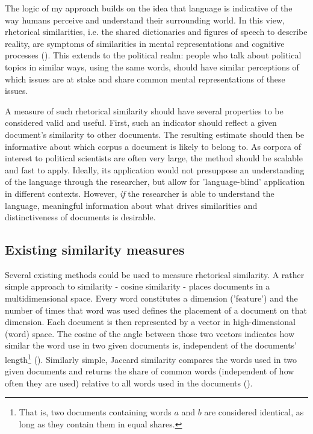 \documentclass{article}
\begin{document}
The logic of my approach builds on the idea that language is indicative of the way humans perceive and understand their surrounding world. In this view, rhetorical similarities, i.e. the shared dictionaries and figures of speech to describe reality, are symptoms of similarities in mental representations and cognitive processes (\cite{Lakoff1980Metaphors, Pennebaker2003}). This extends to the political realm: people who talk about political topics in similar ways, using the same words, should have similar perceptions of which issues are at stake and share common mental representations of these issues.\par

A measure of such rhetorical similarity should have several properties to be considered valid and useful. First, such an indicator should reflect a given document's similarity to other documents. The resulting estimate should then be informative about which corpus a document is likely to belong to. As corpora of interest to political scientists are often very large, the method should be scalable and fast to apply. Ideally, its application would not presuppose an understanding of the language through the researcher, but allow for 'language-blind' application in different contexts. However, \textit{if} the researcher is able to understand the language, meaningful information about what drives similarities and distinctiveness of documents is desirable. \par


\subsection{Existing similarity measures}

Several existing methods could be used to measure rhetorical similarity. A rather simple approach to similarity - cosine similarity - places documents in a multidimensional space. Every word constitutes a dimension ('feature') and the number of times that word was used defines the placement of a document on that dimension. Each document is then represented by a vector in high-dimensional (word) space. The cosine of the angle between those two vectors indicates how similar the word use in two given documents is, independent of the documents' length\footnote{That is, two documents containing words $a$ and $b$ are considered identical, as long as they contain them in equal shares.} (\cite{Similarity2007a}).  Similarly simple, Jaccard similarity compares the words used in two given documents and returns the share of common words (independent of how often they are used) relative to all words used in the documents (\cite{Jaccard1912}).\par
\end{document}
